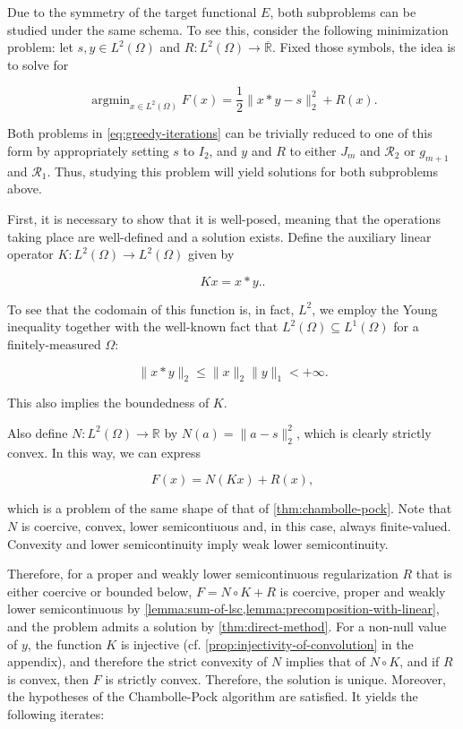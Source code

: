 \documentclass[twocolumn,twoside,a4paper,10pt]{IEEEtran}
\DeclareMathOperator*{\argmin}{\operatorname*{argmin}}
\DeclareMathOperator*{\argmin}{arg\,min}
\begin{document}
Due to the symmetry of the target functional \(E\), both subproblems can be studied under the same schema. To see this, consider the following minimization problem: let \(s, y\in L^2(\Omega)\) and \(R\colon L^2(\Omega)\to\overline{\mathbb{R}}\). Fixed those symbols, the idea is to solve for

\[
  \argmin_{x\in L^2(\Omega)}F(x) = \frac12\|x\ast y - s\|_2^2 + R(x)
.\]

Both problems in \cref{eq:greedy-iterations} can be trivially reduced to one of this form by appropriately setting \(s\) to \(I_2\), and \(y\) and \(R\) to either \(J_m\) and \(\mathcal{R}_2\) or \(g_{m+1}\) and \(\mathcal{R}_1\). Thus, studying this problem will yield solutions for both subproblems above.

First, it is necessary to show that it is well-posed, meaning that the operations taking place are well-defined and a solution exists. Define the auxiliary linear operator \(K\colon L^2(\Omega)\to L^2(\Omega)\) given by

\[
  Kx=x\ast y.
.\]

To see that the codomain of this function is, in fact, \(L^2\), we employ the Young inequality together with the well-known fact that \(L^2(\Omega)\subseteq L^1(\Omega)\) for a finitely-measured \(\Omega\):

\[
  \|x\ast y\|_2 \leq \|x\|_{2}\|y\|_{1} < +\infty
.\]

This also implies the boundedness of \(K\).

Also define \(N\colon L^2(\Omega)\to \mathbb{R}\) by \(N(a) = \|a - s\|_{2}^2\), which is clearly strictly convex. In this way, we can express

\[
  F(x) = N(Kx) + R(x),
\]

which is a problem of the same shape of that of \cref{thm:chambolle-pock}. Note that \(N\) is coercive, convex, lower semicontiuous and, in this case, always finite-valued. Convexity and lower semicontinuity imply weak lower semicontinuity.

Therefore, for a proper and weakly lower semicontinuous regularization \(R\) that is either coercive or bounded below, 
\(F=N\circ K + R\) is coercive, proper and weakly lower semicontinuous by \cref{lemma:sum-of-lsc,lemma:precomposition-with-linear}, and the problem admits a solution by \cref{thm:direct-method}. For a non-null value of \(y\), the function \(K\) is injective (cf. \cref{prop:injectivity-of-convolution} in the appendix), and therefore the strict convexity of \(N\) implies that of \(N\circ K\), and if \(R\) is convex, then \(F\) is strictly convex. Therefore, the solution is unique. Moreover, the hypotheses of the Chambolle-Pock algorithm are satisfied. It yields the following iterates:
\end{document}
